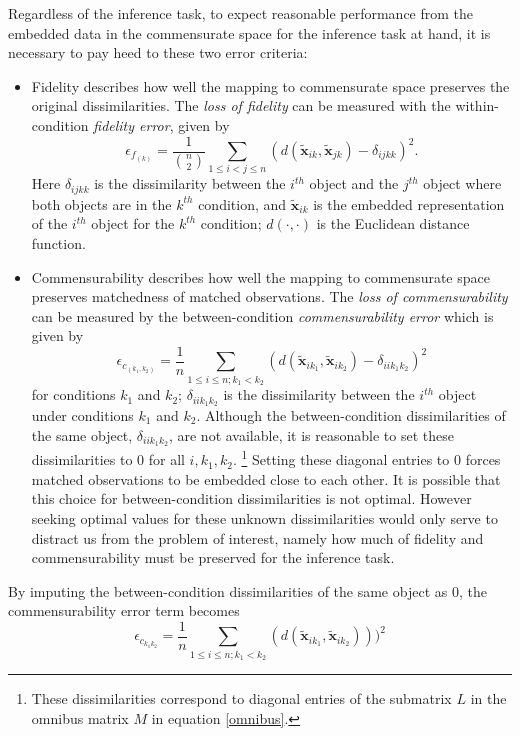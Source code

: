 \documentclass[12pt,oneside,final]{thesis}\usepackage[]{graphicx}\usepackage[]{color}
\begin{document}
Regardless of the inference task,  to expect reasonable performance from the embedded data in the commensurate space  for the inference task at hand, 
it is necessary to pay heed to these two error criteria: %
\begin{itemize}
\item Fidelity describes how well the mapping to commensurate space preserves the original dissimilarities. The \emph{loss of fidelity} can be measured with the  within-condition \emph{ fidelity error}, given by
    \[
\epsilon_{f_{(k)}} = \frac{1}{{{n}\choose{2}}} \sum_{1 \leq i < j \leq n} (d(\widetilde{\bm{x}}_{ik},\widetilde{\bm{x}}_{jk})-\delta_{ijkk})^2
.\] 
Here $\delta_{ijkk}$ is the dissimilarity between the $i^{th}$ object and the $j^{th}$ object where both objects are in the $k^{th}$  condition, and $\widetilde{\bm{x}}_{ik}$ is the embedded representation of the $i^{th}$ object  for the $k^{th}$ condition;  $d(\cdot,\cdot)$ is the Euclidean distance function.

\item Commensurability describes how well the mapping to commensurate space preserves matchedness of matched observations. The \emph{loss of commensurability} can be measured by the between-condition {\em commensurability error} which is given by
    \[
\epsilon_{c_{(k_1,k_2)}} = \frac{1}{n} \sum_{1 \leq i \leq n;k_1 <k_2} (d(\widetilde{\bm{x}}_{ik_1},\widetilde{\bm{x}}_{ik_2})- { \delta_{iik_1k_2}})^2
\label{comm-error}
\]
 for conditions $k_1$ and $k_2$; $\delta_{iik_1k_2}$  is the dissimilarity between the $i^{th}$ object under  conditions   $k_1$ and  $k_2$. 
Although  the between-condition dissimilarities of the same object, ${ \delta_{iik_1k_2}}$, are not available,  it is reasonable to set these dissimilarities to $0$ for all $i,k_1,k_2$. \footnote{These dissimilarities correspond to  diagonal  entries of the  submatrix $L$ in  the omnibus matrix  $M$ in equation \eqref{omnibus}.} Setting these diagonal entries to $0$ forces matched observations to be embedded close to each other. It is possible that this choice for between-condition dissimilarities is not  optimal. However seeking optimal values for these unknown dissimilarities would only serve to distract us from the problem of interest, namely how much of fidelity and commensurability must be preserved for the inference task.
\label{commens}  
\end{itemize}
By imputing the between-condition dissimilarities of the same object as 0, the commensurability error  term becomes
  \[
\epsilon_{c_{k_1k_2}} = \frac{1}{n} \sum_{1 \leq i \leq n;k_1< k_2} (d(\widetilde{\bm{x}}_{ik_1},\widetilde{\bm{x}}_{ik_2})))^2
\]
\end{document}
